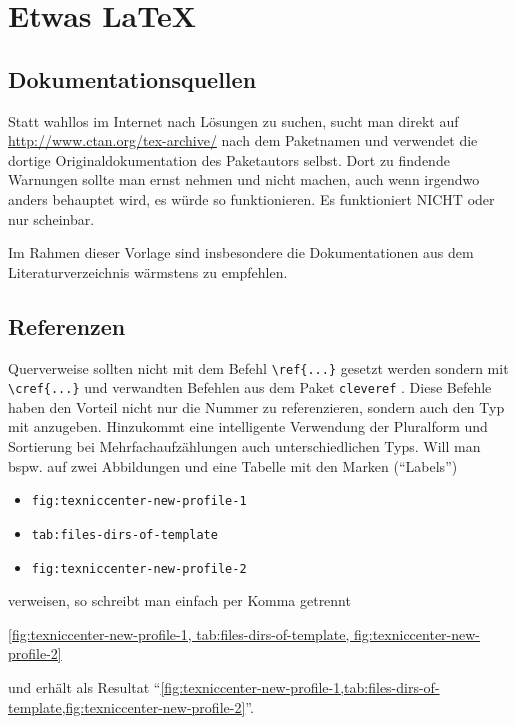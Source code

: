 \chapter{Etwas LaTeX}

\section{Dokumentationsquellen}

Statt wahllos im Internet nach Lösungen zu suchen, sucht man direkt auf
\url{http://www.ctan.org/tex-archive/} nach dem Paketnamen und verwendet die
dortige Originaldokumentation des Paketautors selbst. Dort zu findende Warnungen
sollte man ernst nehmen und nicht machen, auch wenn irgendwo anders behauptet
wird, es würde so funktionieren. Es funktioniert NICHT oder nur scheinbar.

Im Rahmen dieser Vorlage sind insbesondere die Dokumentationen aus dem
Literaturverzeichnis wärmstens zu empfehlen.

\section{Referenzen}

Querverweise sollten nicht mit dem Befehl \verb#\ref{...}# gesetzt werden sondern
mit \verb#\cref{...}# und verwandten Befehlen aus dem Paket \texttt{cleveref}
\parencite{Cubitt2013}. Diese Befehle haben den Vorteil nicht nur die Nummer
zu referenzieren, sondern auch den Typ mit anzugeben. Hinzukommt eine
intelligente Verwendung der Pluralform und Sortierung bei Mehrfachaufzählungen
auch unterschiedlichen Typs. Will man bspw. auf zwei Abbildungen und eine Tabelle
mit den Marken (\enquote{Labels})
\begin{itemize}
\item \texttt{fig:texniccenter-new-profile-1}
\item \texttt{tab:files-dirs-of-template}
\item \texttt{fig:texniccenter-new-profile-2}
\end{itemize}
verweisen, so schreibt man einfach per Komma getrennt
\begin{latex}[caption={Cleveres Referenzieren},label={lst:cref}]
\cref{fig:texniccenter-new-profile-1,
      tab:files-dirs-of-template,
      fig:texniccenter-new-profile-2}
\end{latex}
und erhält als Resultat \enquote{\cref{fig:texniccenter-new-profile-1,tab:files-dirs-of-template,fig:texniccenter-new-profile-2}}.

